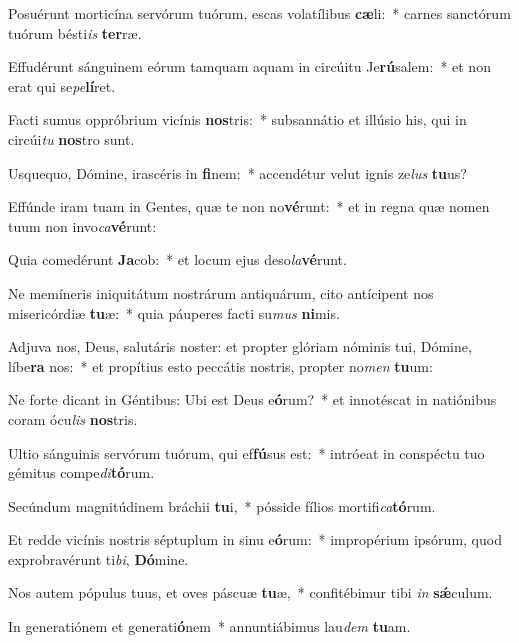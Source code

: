 \item Posuérunt morticína servórum tuórum, escas volatílibus \textbf{cæ}li:~* carnes sanctórum tuórum bésti\textit{is} \textbf{ter}ræ.
\item Effudérunt sánguinem eórum tamquam aquam in circúitu Je\textbf{rú}salem:~* et non erat qui se\textit{pe}\textbf{lí}ret.
\item Facti sumus oppróbrium vicínis \textbf{nos}tris:~* subsannátio et illúsio his, qui in circúi\textit{tu} \textbf{nos}tro sunt.
\item Usquequo, Dómine, irascéris in \textbf{fi}nem:~* accendétur velut ignis ze\textit{lus} \textbf{tu}us?
\item Effúnde iram tuam in Gentes, quæ te non no\textbf{vé}runt:~* et in regna quæ nomen tuum non invo\textit{ca}\textbf{vé}runt:
\item Quia comedérunt \textbf{Ja}cob:~* et locum ejus deso\textit{la}\textbf{vé}runt.
\item Ne memíneris iniquitátum nostrárum antiquárum, cito antícipent nos misericórdiæ \textbf{tu}æ:~* quia páuperes facti su\textit{mus} \textbf{ni}mis.
\item Adjuva nos, Deus, salutáris noster: et propter glóriam nóminis tui, Dómine, líbe\textbf{ra} nos:~* et propítius esto peccátis nostris, propter no\textit{men} \textbf{tu}um:
\item Ne forte dicant in Géntibus: Ubi est Deus e\textbf{ó}rum?~* et innotéscat in natiónibus coram ócu\textit{lis} \textbf{nos}tris.
\item Ultio sánguinis servórum tuórum, qui ef\textbf{fú}sus est:~* intróeat in conspéctu tuo gémitus compe\textit{di}\textbf{tó}rum.
\item Secúndum magnitúdinem bráchii \textbf{tu}i,~* pósside fílios mortifi\textit{ca}\textbf{tó}rum.
\item Et redde vicínis nostris séptuplum in sinu e\textbf{ó}rum:~* impropérium ipsórum, quod exprobravérunt ti\textit{bi}, \textbf{Dó}mine.
\item Nos autem pópulus tuus, et oves páscuæ \textbf{tu}æ,~* confitébimur tibi \textit{in} \textbf{sǽ}culum.
\item In generatiónem et generati\textbf{ó}nem~* annuntiábimus lau\textit{dem} \textbf{tu}am.
